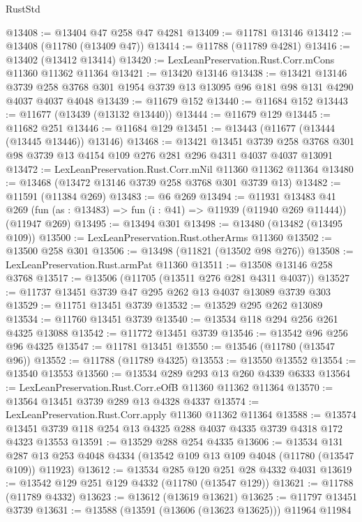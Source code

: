 \begin{lexlean}{RustStd}
\begin{coremodule}
@13408 := @13404 @47 @258 @47 @4281
@13409 := @11781 @13146
@13412 := @13408 (@11780 (@13409 @47))
@13414 := @11788 (@11789 @4281)
@13416 := @13402 (@13412 @13414)
@13420 := LexLeanPreservation.Rust.Corr.mCons @11360 @11362 @11364
@13421 := @13420 @13146
@13438 := @13421
    @13146
    @3739
    @258
    @3768
    @301
    @1954
    @3739
    @13
    @13095
    @96
    @181
    @98
    @131
    @4290
    @4037
    @4037
    @4048
@13439 := @11679 @152
@13440 := @11684 @152
@13443 := @11677 (@13439 (@13132 @13440))
@13444 := @11679 @129
@13445 := @11682 @251
@13446 := @11684 @129
@13451 := @13443 (@11677 (@13444 (@13445 @13446)) @13146)
@13468 := @13421
    @13451
    @3739
    @258
    @3768
    @301
    @98
    @3739
    @13
    @4154
    @109
    @276
    @281
    @296
    @4311
    @4037
    @4037
    @13091
@13472 := LexLeanPreservation.Rust.Corr.mNil @11360 @11362 @11364
@13480 := @13468 (@13472 @13146 @3739 @258 @3768 @301 @3739 @13)
@13482 := @11591 (@11384 @269)
@13483 := @6 @269
@13494 := @11931
    @13483
    @41
    @269
    (fun (as : @13483) => fun (i : @41) => @11939 (@11940 @269 @11444))
    (@11947 @269)
@13495 := @13494 @301
@13498 := @13480 (@13482 (@13495 @109))
@13500 := LexLeanPreservation.Rust.otherArms @11360
@13502 := @13500 @258 @301
@13506 := @13498 (@11821 (@13502 @98 @276))
@13508 := LexLeanPreservation.Rust.armPat @11360
@13511 := @13508 @13146 @258 @3768
@13517 := @13506 (@11705 (@13511 @276 @281 @4311 @4037))
@13527 := @11737 @13451 @3739 @47 @295 @262 @13 @4037 @13089 @3739 @303
@13529 := @11751 @13451 @3739
@13532 := @13529 @295 @262 @13089
@13534 := @11760 @13451 @3739
@13540 := @13534 @118 @294 @256 @261 @4325 @13088
@13542 := @11772 @13451 @3739
@13546 := @13542 @96 @256 @96 @4325
@13547 := @11781 @13451
@13550 := @13546 (@11780 (@13547 @96))
@13552 := @11788 (@11789 @4325)
@13553 := @13550 @13552
@13554 := @13540 @13553
@13560 := @13534 @289 @293 @13 @260 @4339 @6333
@13564 := LexLeanPreservation.Rust.Corr.eOfB @11360 @11362 @11364
@13570 := @13564 @13451 @3739 @289 @13 @4328 @4337
@13574 := LexLeanPreservation.Rust.Corr.apply @11360 @11362 @11364
@13588 := @13574 @13451 @3739 @118 @254 @13 @4325 @288 @4037 @4335 @3739 @4318 @172 @4323 @13553
@13591 := @13529 @288 @254 @4335
@13606 := @13534
    @131
    @287
    @13
    @253
    @4048
    @4334
    (@13542 @109 @13 @109 @4048 (@11780 (@13547 @109)) @11923)
@13612 := @13534 @285 @120 @251 @28 @4332 @4031
@13619 := @13542 @129 @251 @129 @4332 (@11780 (@13547 @129))
@13621 := @11788 (@11789 @4332)
@13623 := @13612 (@13619 @13621)
@13625 := @11797 @13451 @3739
@13631 := @13588 (@13591 (@13606 (@13623 @13625))) @11964 @11984

\end{coremodule}
\end{lexlean}
